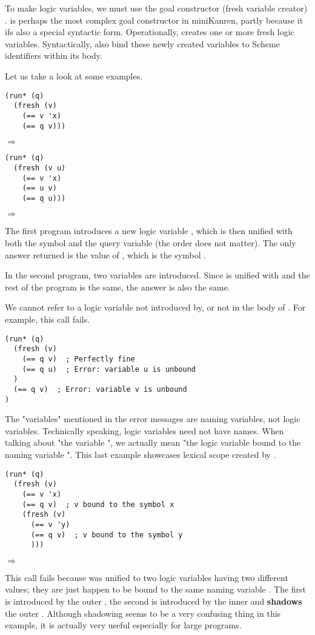 To make logic variables, we must use the goal constructor (fresh variable creator) .  is perhaps the most complex goal constructor in miniKanren, partly because it ifs also a special syntactic form. Operationally,  creates one or more fresh logic variables. Syntactically,  also bind these newly created variables to Scheme identifiers within its body.

Let us take a look at some examples.

\begin{lstlisting}
(run* (q)
  (fresh (v)
    (== v 'x)
    (== q v)))
\end{lstlisting}
$\Rightarrow$ 

\begin{lstlisting}
(run* (q)
  (fresh (v u)
    (== v 'x)
    (== u v)
    (== q u)))
\end{lstlisting}
$\Rightarrow$ 

The first program introduces a new logic variable , which is then unified with both the symbol  and the query variable  (the order does not matter). The only answer returned is the value of , which is the symbol .

In the second program, two variables are introduced. Since  is unified with  and the rest of the program is the same, the answer is also the same.

We cannot refer to a logic variable not introduced by, or not in the body of . For example, this call fails.
\begin{lstlisting}
(run* (q)
  (fresh (v)
    (== q v)  ; Perfectly fine
    (== q u)  ; Error: variable u is unbound
  )
  (== q v)  ; Error: variable v is unbound
)
\end{lstlisting}
The "variables" mentioned in the error messages are naming variables, not logic variables. Technically speaking, logic variables need not have names. When talking about "the variable ", we actually mean "the logic variable bound to the naming variable ". This last example showcases lexical scope created by .
\begin{lstlisting}
(run* (q)
  (fresh (v)
    (== v 'x)
    (== q v)  ; v bound to the symbol x
    (fresh (v)
      (== v 'y)
      (== q v)  ; v bound to the symbol y
      )))
\end{lstlisting}
$\Rightarrow$ \code{()}

This call fails because  was unified to two logic variables having two different values; they are just happen to be bound to the same naming variable . The first  is introduced by the outer , the second  is introduced by the inner  and \textbf{shadows} the outer . Although shadowing seems to be a very confusing thing in this example, it is actually very useful especially for large programs.

